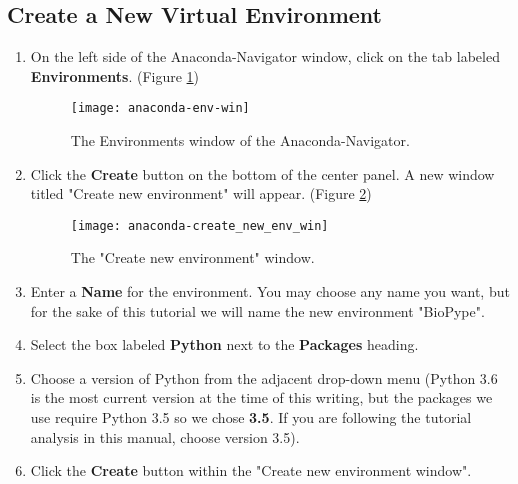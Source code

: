 \subsection{Create a New Virtual Environment}
    \begin{enumerate}
        \item On the left side of the Anaconda-Navigator window, click on the tab labeled \textbf{Environments}. (Figure \ref{anaconda-env-win}) 
        \begin{figure}
            \texttt{[image: anaconda-env-win]}
            \caption{The Environments window of the Anaconda-Navigator.}
            \label{anaconda-env-win}
        \end{figure}
        \item Click the \textbf{Create} button on the bottom of the center panel. A new window titled "Create new environment" will appear. (Figure \ref{anaconda-create-new-env-win})
        \begin{figure}[h]
            \begin{center}
            \texttt{[image: anaconda-create\_new\_env\_win]}
            \caption{The "Create new environment" window.}
            \label{anaconda-create-new-env-win}
            \end{center}
        \end{figure}
        \item Enter a \textbf{Name} for the environment. You may choose any name you want, but for the sake of this tutorial we will name the new environment "BioPype".
        \item Select the box labeled \textbf{Python} next to the \textbf{Packages} heading.
        \item Choose a version of Python from the adjacent drop-down menu (Python 3.6 is the most current version at the time of this writing, but the packages we use require Python 3.5 so we chose \textbf{3.5}. If you are following the tutorial analysis in this manual, choose version 3.5).
        \item Click the \textbf{Create} button within the "Create new environment window".
    \end{enumerate}


